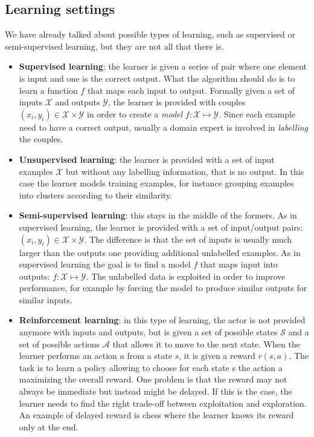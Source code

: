 \subsection{Learning settings}
We have already talked about possible types of learning, such as supervised or semi-supervised learning, but they are not all that there is.  
\begin{itemize}
	\item \textbf{Supervised learning}: the learner is given a series of pair where one element is input and one is the correct output. What the algorithm should do is to learn a function $f$ that maps each input to output. Formally given a set of inputs $\mathcal{X}$ and outputs $\mathcal{Y}$, the learner is provided with couples $(x_i, y_i)\in \mathcal{X}\times\mathcal{Y}$ in order to create a \textit{model} $f:\mathcal{X}\mapsto \mathcal{Y}$. Since each example need to have a correct output, usually a domain expert is involved in \textit{labelling} the couples. 
	\item \textbf{Unsupervised learning}: the learner is provided with a set of input examples $\mathcal{X}$ but without any labelling information, that is no output. In this case the learner models training examples, for instance grouping examples into clusters according to their similarity. 
	\item \textbf{Semi-supervised learning}: this stays in the middle of the formers. As in supervised learning, the learner is provided with a set of input/output pairs: $(x_i, y_i)\in \mathcal{X}\times\mathcal{Y}$. The difference is that the set of inputs is usually much larger than the outputs one providing additional unlabelled examples. As in supervised learning the goal is to find a model $f$ that maps input into outputs: $f:\mathcal{X}\mapsto\mathcal{Y}$. The unlabelled data is exploited in order to improve performance, for example by forcing the model to produce similar outputs for similar inputs. 
	\item \textbf{Reinforcement learning}: in this type of learning, the actor is not provided anymore with inputs and outputs, but is given a set of possible states $\mathcal{S}$ and a set of possible actions $\mathcal{A}$ that allows it to move to the next state. When the learner performs an action $a$ from a state $s$, it is given a reward $r(s,a)$. The task is to learn a policy allowing to choose for each state s the action a maximizing the overall reward. One problem is that the reward may not always be immediate but instead might be delayed. If this is the case, the learner needs to find the right trade-off between exploitation and exploration. An example of delayed reward is chess where the learner knows its reward only at the end.
\end{itemize}

